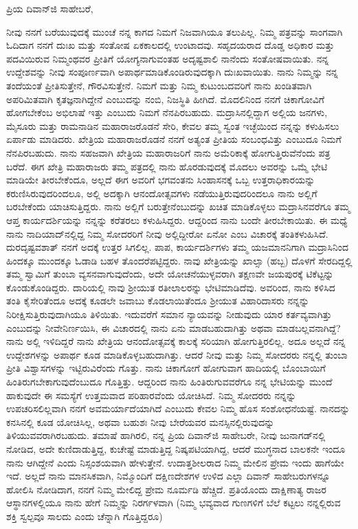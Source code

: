 \vspace{-0.5cm}

\noindent
ಪ್ರಿಯ ದಿವಾನ್‌ಜಿ ಸಾಹೇಬರೆ,

ನೀವು ನನಗೆ ಬರೆಯುವುದಕ್ಕೆ ಮುಂಚೆ ನನ್ನ ಕಾಗದ ನಿಮಗೆ ನಿಜವಾಗಿಯೂ ತಲುಪಿಲ್ಲ. ನಿಮ್ಮ ಪತ್ರವನ್ನು ಸಾಂಗವಾಗಿ ಓದಿದಾಗ ನನಗೆ ದುಃಖ ಮತ್ತು ಸಂತೋಷ ಏಕಕಾಲದಲ್ಲಿ ಉಂಟಾದವು. ಸಹೃದಯರಾದ ದೊಡ್ಡ ಅಧಿಕಾರ ಮತ್ತು ಪದವಿಯಿರುವ ನಿಮ್ಮಂಥವರ ಪ್ರೀತಿಗೆ ಯೋಗ್ಯನಾಗುವಂತಹ ಅದೃಷ್ಟಶಾಲಿ ನಾನೆಂದು ಸಂತೋಷವಾಯಿತು. ನನ್ನ ಉದ್ದೇಶವನ್ನು ನೀವು ಸಂಪೂರ್ಣವಾಗಿ ಅಪಾರ್ಥಮಾಡಿಕೊಂಡಿರುವುದಕ್ಕಾಗಿ ದುಃಖವಾಯಿತು. ನಾನು ನಿಮ್ಮನ್ನು ನನ್ನ ತಂದೆಯಂತೆ ಪ್ರೀತಿಸುತ್ತೇನೆ, ಗೌರವಿಸುತ್ತೇನೆ. ನಿಮಗೆ ಮತ್ತು ನಿಮ್ಮ ಕುಟುಂಬದವರಿಗೆ ನಾನು ಖಂಡಿತವಾಗಿ ಅಪರಿಮಿತವಾಗಿ ಕೃತಜ್ಞನಾಗಿದ್ದೇನೆ ಎಂಬುದನ್ನು ನಂಬಿ, ನಿಜಸ್ಥಿತಿ ಹೀಗಿದೆ. ಮೊದಲಿನಿಂದ ನನಗೆ ಚಿಕಾಗೋವಿಗೆ ಹೋಗಬೇಕೆಂಬ ಅಭಿಲಾಷೆ ಇತ್ತು ಎಂಬುದು ನಿಮಗೆ ನೆನಪಿರಬಹುದು. ಮದ್ರಾಸಿನಲ್ಲಿದ್ದಾಗ ಅಲ್ಲಿಯ ಜನಗಳು, ಮೈಸೂರು ಮತ್ತು ರಾಮನಾಡಿನ ಮಹಾರಾಜರೊಡನೆ ಸೇರಿ, ಕೇವಲ ತಮ್ಮ ಸ್ವಂತ ಇಚ್ಛೆಯಿಂದ ನನ್ನನ್ನು ಕಳುಹಿಸಲು ಏರ್ಪಾಡು ಮಾಡಿದರು. ಖೇತ್ರಿಯ ಮಹಾರಾಜರೊಡನೆ ನನಗೆ ಅತ್ಯಂತ ಪ್ರೀತಿಯ ಸಂಬಂಧವಿತ್ತು ಎಂಬುದೂ ನಿಮಗೆ ನೆನಪಿರಬಹುದು. ನಾನು ಸಹಜವಾಗಿ ಖೇತ್ರಿಯ ಮಹಾರಾಜರಿಗೆ ನಾನು ಅಮೆರಿಕಾಕ್ಕೆ ಹೋಗುತ್ತಿರುವೆನೆಂದು ಪತ್ರ ಬರೆದೆ. ಈಗ ಖೇತ್ರಿ ಮಹಾರಾಜರು ತಮ್ಮ ಪತ್ರದಲ್ಲಿ ನಾನು ಹೊರಡುವುದಕ್ಕೆ ಮೊದಲು ಅವರನ್ನು ಒಮ್ಮೆ ಭೇಟಿ ಮಾಡಿಯೇ ತೀರಬೇಕೆಂದೂ, ಅಲ್ಲದೆ ಈಗ ಅವರಿಗೆ ಭಗವಂತನು ಸಿಂಹಾಸನಕ್ಕೆ ಒಬ್ಬ ಉತ್ತರಾಧಿಕಾರ\break ಯನ್ನು ಕರುಣಿಸಿರುವುದರಿಂದಲೂ, ಅಲ್ಲಿ ಅದಕ್ಕಾಗಿ ಆನಂದೋತ್ಸವಗಳು ನಡೆಯುತ್ತಿರುವುದರಿಂದಲೂ ನಾನು ಅಲ್ಲಿಗೆ ಬರಬೇಕೆಂದು ಯಾಚಿಸುತ್ತಿದ್ದರು. ನಾನು ಅಲ್ಲಿಗೆ ಬರುತ್ತೇ\break ನೆಂಬುದನ್ನು ಖಚಿತ ಮಾಡಿಕೊಳ್ಳಲು ಮದ್ರಾಸಿನವರೆಗೂ ತಮ್ಮ ಆಪ್ತ ಕಾರ್ಯದರ್ಶಿಯನ್ನು ನನ್ನನ್ನು ಕರೆತರಲು ಕಳುಹಿಸಿದ್ದರು. ಆದ್ದರಿಂದ ನಾನು ಬಂದೇ ತೀರಬೇಕಾಯಿತು. ಈ ಮಧ್ಯೆ ನಾನು ನಾದಿಯಾದ್‌ನಲ್ಲಿದ್ದ ನಿಮ್ಮ ಸೋದರರಿಗೆ ನೀವು ಅಲ್ಲಿದ್ದೀರೋ ಏನೋ ಎಂಬ ವಿಚಾರಕ್ಕೆ ತಂತಿಕಳುಹಿಸಿದೆ. ದುರದೃಷ್ಟವಶಾತ್ ನನಗೆ ಅದಕ್ಕೆ ಉತ್ತರ ಸಿಗಲಿಲ್ಲ. ಪಾಪ, ಕಾರ್ಯದರ್ಶಿಗಳು ತಮ್ಮ ಯಜಮಾನನಿಗಾಗಿ ಮದ್ರಾಸಿನಿಂದ ಹಿಂದಕ್ಕೂ ಮುಂದಕ್ಕೂ ಓಡಾಡಿ ಬಹಳ ತೊಂದರೆಪಟ್ಟಿದ್ದರು. ನಾವು ಖೇತ್ರಿಯನ್ನು ಖಾಲ್ಸಾ (ಹಬ್ಬ) ದೊಳಗೆ ಸೇರದಿದ್ದಲ್ಲಿ ತಮ್ಮ ಸ್ವಾಮಿಗೆ ತುಂಬಾ ವ್ಯಸನವಾಗುವುದೆಂದು, ಅದೇ ಯೋಚನೆಯುಳ್ಳವರಾಗಿ ತಕ್ಷಣವೇ ಜಯಪುರಕ್ಕೆ ಟಿಕೆಟ್ಟನ್ನು ಕೊಂಡುಕೊಂಡಿದ್ದರು. ದಾರಿಯಲ್ಲಿ ನಾವು ಶ‍್ರೀಯುತ ರತೀಲಾಲರನ್ನು ಭೇಟಿಮಾಡಿದೆವು. ಅವರಿಂದ, ನಾನು ಕಳಿಸಿದ ತಂತಿ ಕೈಸೇರಿತೆಂದೂ ಅದಕ್ಕೆ ಕೂಡಲೇ ಜವಾಬು ಕೊಡಲಾಯಿತೆಂದೂ ಶ‍್ರೀಯುತ ವಿಹಾರಿದಾಸರು ನನ್ನನ್ನು ನಿರೀಕ್ಷಿಸುತ್ತಿರುವುದಾಗಿಯೂ ತಿಳಿಯಿತು. ಇದುವರೆಗೆ ಸಮಾನ ನ್ಯಾಯವನ್ನು ನೀಡುವುದು ಯಾರ ಕರ್ತವ್ಯವಾಗಿತ್ತು ಎಂಬುದನ್ನು ನೀವೇನಿರ್ಣಯಿಸಿ, ಈ ವಿಚಾರದಲ್ಲಿ ನಾನು ಏನು ಮಾಡಬಹುದಾಗಿತ್ತು ಅಥವಾ ಮಾಡಬಲ್ಲವನಾಗಿದ್ದೆ?ನಾನು ಅಲ್ಲಿ ಇಳಿದಿದ್ದರೆ ನಾನು ಖೇತ್ರಿಯ ಆನಂದೋತ್ಸವಕ್ಕೆ ಕಾಲಕ್ಕೆ ಸರಿಯಾಗಿ ಹೋಗುತ್ತಿರಲಿಲ್ಲ. ಅದೂ ಅಲ್ಲದೆ ನನ್ನ ಉದ್ದೇಶಗಳನ್ನು ಅಪಾರ್ಥ ಕೂಡ ಮಾಡಿಕೊಳ್ಳಬಹುದಾಗಿತ್ತು. ಆದರೆ ನೀವು ಮತ್ತು ನಿಮ್ಮ ಸೋದರರು ನನ್ನಲ್ಲಿ ತುಂಬಾ ಪ್ರೀತಿ ವಿಶ್ವಾಸಗಳನ್ನು ಇಟ್ಟಿರುವಿರೆಂದು ಗೊತ್ತು. ನಾನು ಚಿಕಾಗೋಗೆ ಹೋಗುವಾಗ ಹಾದಿಯಲ್ಲಿ ಬೊಂಬಾಯಿಗೆ ಹಿಂತಿರುಗಬೇಕಾಗುವುದೆಂಬುದೂ ಗೊತ್ತಿತ್ತು. ಆದ್ದರಿಂದ ನಾನು ಹಿಂತಿರುಗುವವರೆಗೂ ನನ್ನ ಭೇಟಿಯನ್ನು ಮುಂದೆ ಹಾಕುವುದೇ ಈ ಸಮಸ್ಯೆಗೆ ಉತ್ತಮವಾದ ಪರಿಹಾರವೆಂದು ಯೋಚಿಸಿದೆ. ನಿಮ್ಮ ಸೋದರರು ನನ್ನನ್ನು ಉಪಚರಿಸಲಿಲ್ಲವಾಗಿ ನನಗೆ ಅವಮರ್ಯಾದೆಯಾಗಿದೆ ಎಂಬುದು ಕೇವಲ ನಿಮ್ಮ ಹೊಸ ಸಂಶೋಧನೆಯಷ್ಟೆ. ನಾನದನ್ನು ಕನಸಿನಲ್ಲಿ ಕೂಡ ಯೋಚಿಸಿಲ್ಲ, ಅಥವಾ ಬಹುಶಃ ನೀವು ಬೇರೆಯವರ ಮನಸ್ಸಿನಲ್ಲಿರುವುದನ್ನು ತಿಳಿಯುವವರಾಗಿರಬಹುದು. ತಮಾಷೆ ಹಾಗಿರಲಿ, ನನ್ನ ಪ್ರಿಯ ದಿವಾನ್‌ಜಿ ಸಾಹೇಬರೇ, ನೀವು ಜುನಾಗಡ್‌ನಲ್ಲಿ ನೋಡಿದ, ಅದೇ ಕುಣಿದಾಡುತ್ತಿದ್ದ, ಕುಚೇಷ್ಟೆ ಮಾಡುತ್ತಿದ್ದ ನಿಷ್ಕಪಟಿಯಾಗಿದ್ದ, ಆದರೆ ಮುಗ್ಧನಾದ ಬಾಲಕನೇ ಇಂದೂ ನಾನು ಆಗಿದ್ದೇನೆ ಎಂದು ನಿಸ್ಸಂಶಯವಾಗಿ ಹೇಳುತ್ತೇನೆ. ಉದಾತ್ತಶೀಲರಾದ ನಿಮ್ಮ ಮೇಲಿನ ಪ್ರೇಮ ಇಂದು ಹಾಗೆಯೇ ಇದೆ. ಅಲ್ಲದೆ ನಾನು ಮಾನಸಿಕವಾಗಿ, ನಿಮ್ಮೊಂದಿಗೆ ದಕ್ಷಿಣದೇಶಗಳ ಉಳಿದ ಎಲ್ಲಾ ದಿವಾನ್ ಸಾಹೇಬರುಗಳನ್ನೂ ಹೋಲಿಸಿ ನೋಡಿದಾಗ, ನನಗೆ ನಿಮ್ಮ ಮೇಲಿದ್ದ ಪ್ರೇಮ ನೂರ್ಮಡಿ ಹೆಚ್ಚಿದೆ. ಪ್ರತಿಯೊಂದು ದಾಕ್ಷಿಣಾತ್ಯ ರಾಜರ ಆಸ್ಥಾನಗಳಲ್ಲಿಯೂ ನಾನು ಹೇಗೆ ನಿಮ್ಮನ್ನು ನಿರರ್ಗಳವಾಗಿ (ನಿಮ್ಮ ಭವ್ಯವಾದ ಗುಣಗಳಿಗೆ ಬೆಲೆ ಕಟ್ಟಲು ನನ್ನಲ್ಲಿರುವ ಶಕ್ತಿ ಸ್ವಲ್ಪವೂ ಸಾಲದು ಎಂದು ಚೆನ್ನಾಗಿ ಗೊತ್ತಿದ್ದರೂ) 